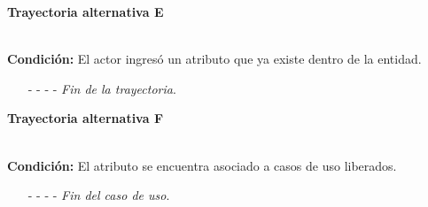 \hypertarget{CU7-1-2:TAE}{\textbf{Trayectoria alternativa E}}\\
\noindent \textbf{Condición:} El actor ingresó un atributo que ya existe dentro de la entidad.
\begin{enumerate}
	\UCpaso[\UCsist] Muestra el mensaje  señalando el campo que presenta la duplicidad en la pantalla .
	\UCpaso Regresa al paso \ref{CU7.1.2-P4} de la trayectoria principal.
	\item[- -] - - {\em {Fin de la trayectoria}}.
\end{enumerate}
\hypertarget{CU7-1-2:TAF}{\textbf{Trayectoria alternativa F}}\\
\noindent \textbf{Condición:} El atributo se encuentra asociado a casos de uso liberados.
\begin{enumerate}
	\UCpaso[\UCsist] Oculta el botón \editar del atributo que esta asociado a casos de uso liberados.
	\item[- -] - - {\em {Fin del caso de uso}}.
\end{enumerate}
